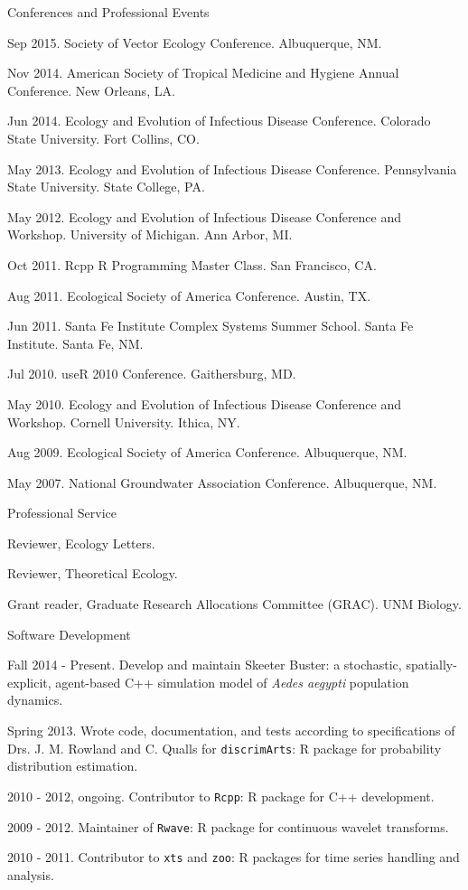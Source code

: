 \documentclass{resume} %
\begin{document}
\begin{rSection}{Conferences and Professional Events}
\item Sep 2015. Society of Vector Ecology Conference.  Albuquerque, NM.
\item Nov 2014. American Society of Tropical Medicine and Hygiene Annual
Conference.  New Orleans, LA.
\item Jun 2014. Ecology and Evolution of Infectious Disease Conference.
Colorado State University.  Fort Collins, CO.
\item May 2013. Ecology and Evolution of Infectious Disease Conference.
Pennsylvania State University.  State College, PA.
\item May 2012. Ecology and Evolution of Infectious Disease Conference
and Workshop.  University of Michigan.  Ann Arbor, MI.
\item Oct 2011. Rcpp R Programming Master Class. San Francisco, CA.
\item Aug 2011. Ecological Society of America Conference. Austin, TX.
\item Jun 2011. Santa Fe Institute Complex Systems Summer School. Santa Fe Institute. Santa Fe, NM. 
\item Jul 2010.  useR 2010 Conference. Gaithersburg, MD. 
\item May 2010. Ecology and Evolution of Infectious Disease Conference
and Workshop.  Cornell University.  Ithica, NY.
\item Aug 2009. Ecological Society of America Conference. Albuquerque, NM.
\item May 2007. National Groundwater Association Conference. Albuquerque, NM. 
\end{rSection}

\begin{rSection}{Professional Service}
\item Reviewer, Ecology Letters.
\item Reviewer, Theoretical Ecology.
\item Grant reader, Graduate Research Allocations Committee (GRAC). UNM Biology.
\end{rSection}

\clearpage
\begin{rSection}{Software Development}
\item Fall 2014 - Present. Develop and maintain Skeeter Buster: a stochastic,
spatially-explicit, agent-based C++ simulation model of {\em Aedes aegypti}
population dynamics.
\item Spring 2013. Wrote code, documentation, and tests according to
specifications of Drs. J. M. Rowland and C. Qualls for \texttt{discrimArts}: R package for probability
distribution estimation.
\item 2010 - 2012, ongoing. Contributor to \texttt{Rcpp}: R package for C++ development.
\item 2009 - 2012. Maintainer of \texttt{Rwave}: R package for continuous wavelet transforms.
\item 2010 - 2011. Contributor to \texttt{xts} and \texttt{zoo}: R packages for time series handling and analysis.
\end{rSection}
\end{document}
